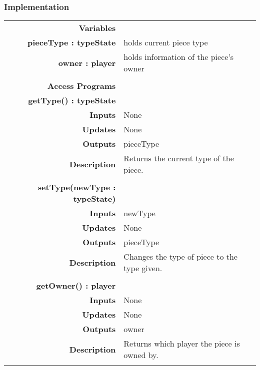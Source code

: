 \documentclass[10pt]{article}
\begin{document}
    \subsubsection{Implementation}
        \begin{tabularx}{\linewidth}{ >{\bfseries}r Xp{5cm} }
            Variables       & \begin{tabular}[t]{@{} l p{8cm}} 
                                     & \\
                                    pieceType : typeState & holds current piece type \\
                                    owner : player & holds information of the piece's owner \\
                              \end{tabular} \\

            Access Programs & \begin{tabular}[t]{@{} l l p{8cm}} 
                                     & \\
                                    \bf{getType()} : typeState & \\
                                    Inputs &  None \\
                                    Updates & None \\
                                    Outputs & pieceType \\
                                    Description & Returns the current type of the piece. \\
                                     & \\
                                    \bf{setType(newType : typeState)} & \\
                                    Inputs & newType \\
                                    Updates & None \\ 
                                    Outputs & pieceType \\
                                    Description & Changes the type of piece to the type given.\\
                                     & \\
                                    \bf{getOwner()} : player & \\
                                    Inputs & None \\
                                    Updates & None \\
                                    Outputs & owner \\ 
                                    Description & Returns which player the piece is owned by.\\
                              \end{tabular} \\
                              
        \end{tabularx}
        
\end{document}
